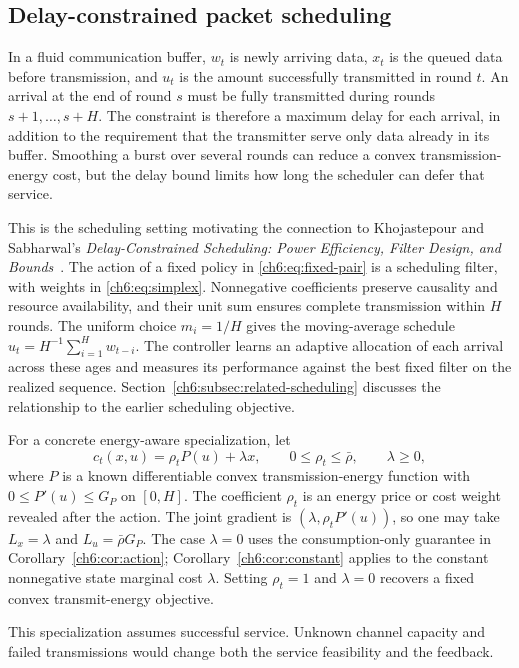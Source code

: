 \documentclass[11pt]{article}
\theoremstyle{plain}
\theoremstyle{remark}
\numberwithin{equation}{section}
\begin{document}
\subsection{Delay-constrained packet scheduling}
\label{ch6:subsec:delay-scheduling}

In a fluid communication buffer, $w_t$ is newly arriving data, $x_t$ is
the queued data before transmission, and $u_t$ is the amount successfully
transmitted in round $t$. An arrival at the end of round $s$ must be fully
transmitted during rounds $s+1,\ldots,s+H$. The constraint is therefore a
maximum delay for each arrival, in addition to the requirement that the
transmitter serve only data already in its buffer. Smoothing a burst over
several rounds can reduce a convex transmission-energy cost, but the delay
bound limits how long the scheduler can defer that service.

This is the scheduling setting motivating the connection to
Khojastepour and Sabharwal's \emph{Delay-Constrained Scheduling: Power
Efficiency, Filter Design, and Bounds}~\cite{khojastepour2004delay}.
The action of a fixed policy in \eqref{ch6:eq:fixed-pair} is a scheduling filter,
with weights in \eqref{ch6:eq:simplex}.
Nonnegative coefficients preserve causality and resource availability,
and their unit sum ensures complete transmission within $H$ rounds.
The uniform choice $m_i=1/H$ gives the moving-average schedule
$u_t=H^{-1}\sum_{i=1}^{H}w_{t-i}$.
The controller learns an adaptive allocation of each arrival across
these ages and measures its performance against the best fixed filter
on the realized sequence. Section~\ref{ch6:subsec:related-scheduling}
discusses the relationship to the earlier scheduling objective.

For a concrete energy-aware specialization, let
\[
 c_t(x,u)=\rho_t P(u)+\lambda x,
 \qquad 0\le\rho_t\le\bar\rho,\qquad \lambda\ge0,
\]
where $P$ is a known differentiable convex transmission-energy function
with $0\le P'(u)\le G_P$ on $[0,H]$. The coefficient $\rho_t$ is an
energy price or cost weight revealed after the action. The joint gradient
is $(\lambda,\rho_tP'(u))$, so one may take $L_x=\lambda$ and
$L_u=\bar\rho G_P$. The case $\lambda=0$ uses the consumption-only
guarantee in Corollary~\ref{ch6:cor:action}; Corollary~\ref{ch6:cor:constant}
applies to the constant nonnegative state marginal cost $\lambda$. Setting $\rho_t=1$ and
$\lambda=0$ recovers a fixed convex transmit-energy objective.

This specialization assumes successful service. Unknown channel capacity
and failed transmissions would change both the service feasibility and
the feedback.
\end{document}
